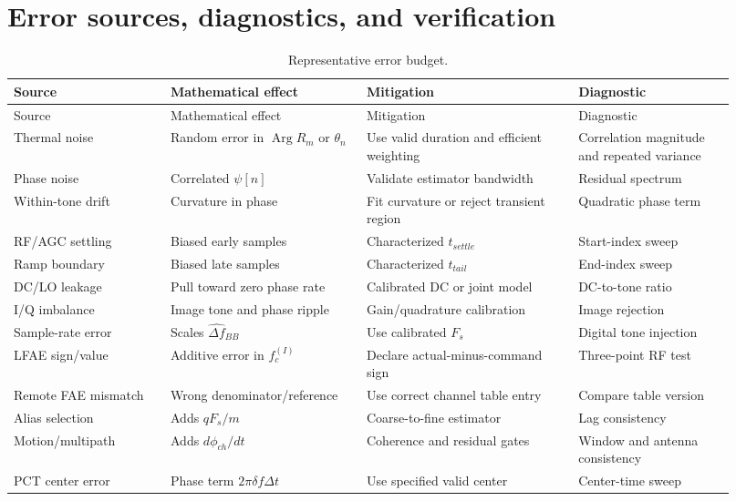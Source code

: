 \documentclass[10pt,a4paper]{article}
\newcommand{\argp}{\operatorname{Arg}}
\begin{document}
\section{Error sources, diagnostics, and verification}
\begin{longtable}{@{}p{0.20\linewidth}p{0.25\linewidth}p{0.27\linewidth}p{0.20\linewidth}@{}}
\caption{Representative error budget.}\\
\toprule Source & Mathematical effect & Mitigation & Diagnostic \\
\midrule\endfirsthead
\toprule Source & Mathematical effect & Mitigation & Diagnostic \\
\midrule\endhead
Thermal noise & Random error in $\argp R_m$ or $\theta_n$ & Use valid duration and efficient weighting & Correlation magnitude and repeated variance\\
Phase noise & Correlated $\psi[n]$ & Validate estimator bandwidth & Residual spectrum\\
Within-tone drift & Curvature in phase & Fit curvature or reject transient region & Quadratic phase term\\
RF/AGC settling & Biased early samples & Characterized $t_{settle}$ & Start-index sweep\\
Ramp boundary & Biased late samples & Characterized $t_{tail}$ & End-index sweep\\
DC/LO leakage & Pull toward zero phase rate & Calibrated DC or joint model & DC-to-tone ratio\\
I/Q imbalance & Image tone and phase ripple & Gain/quadrature calibration & Image rejection\\
Sample-rate error & Scales $\widehat{\Delta f}_{BB}$ & Use calibrated $F_s$ & Digital tone injection\\
LFAE sign/value & Additive error in $f_c^{(I)}$ & Declare actual-minus-command sign & Three-point RF test\\
Remote FAE mismatch & Wrong denominator/reference & Use correct channel table entry & Compare table version\\
Alias selection & Adds $qF_s/m$ & Coarse-to-fine estimator & Lag consistency\\
Motion/multipath & Adds $d\phi_{ch}/dt$ & Coherence and residual gates & Window and antenna consistency\\
PCT center error & Phase term $2\pi\delta f\Delta t$ & Use specified valid center & Center-time sweep\\
\bottomrule
\end{longtable}
\end{document}
